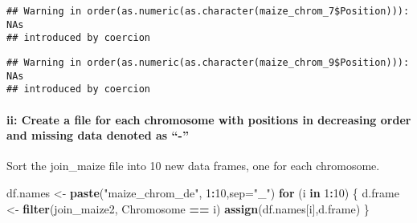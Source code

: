 \documentclass[]{article}
\newenvironment{Shaded}{\begin{snugshade}}{\end{snugshade}}
\newcommand{\ControlFlowTok}[1]{\textcolor[rgb]{0.13,0.29,0.53}{\textbf{#1}}}
\newcommand{\DataTypeTok}[1]{\textcolor[rgb]{0.13,0.29,0.53}{#1}}
\newcommand{\DecValTok}[1]{\textcolor[rgb]{0.00,0.00,0.81}{#1}}
\newcommand{\KeywordTok}[1]{\textcolor[rgb]{0.13,0.29,0.53}{\textbf{#1}}}
\newcommand{\NormalTok}[1]{#1}
\newcommand{\OperatorTok}[1]{\textcolor[rgb]{0.81,0.36,0.00}{\textbf{#1}}}
\newcommand{\StringTok}[1]{\textcolor[rgb]{0.31,0.60,0.02}{#1}}
\let\oldparagraph\paragraph
\renewcommand{\paragraph}[1]{\oldparagraph{#1}\mbox{}}
\begin{document}
\begin{verbatim}
## Warning in order(as.numeric(as.character(maize_chrom_7$Position))): NAs
## introduced by coercion
\end{verbatim}

\begin{Shaded}
\end{Shaded}

\begin{verbatim}
## Warning in order(as.numeric(as.character(maize_chrom_9$Position))): NAs
## introduced by coercion
\end{verbatim}

\begin{Shaded}
\end{Shaded}

\hypertarget{ii-create-a-file-for-each-chromosome-with-positions-in-decreasing-order-and-missing-data-denoted-as--}{%
\paragraph{ii: Create a file for each chromosome with positions in
decreasing order and missing data denoted as
``-''}\label{ii-create-a-file-for-each-chromosome-with-positions-in-decreasing-order-and-missing-data-denoted-as--}}

Sort the join\_maize file into 10 new data frames, one for each
chromosome.

\begin{Shaded}
\begin{Highlighting}[]
\NormalTok{df.names <-}\StringTok{ }\KeywordTok{paste}\NormalTok{(}\StringTok{"maize_chrom_de"}\NormalTok{, }\DecValTok{1}\OperatorTok{:}\DecValTok{10}\NormalTok{,}\DataTypeTok{sep=}\StringTok{"_"}\NormalTok{)}
\ControlFlowTok{for}\NormalTok{ (i }\ControlFlowTok{in} \DecValTok{1}\OperatorTok{:}\DecValTok{10}\NormalTok{) \{}
\NormalTok{  d.frame <-}\StringTok{ }\KeywordTok{filter}\NormalTok{(join_maize2, Chromosome }\OperatorTok{==}\StringTok{ }\NormalTok{i)}
  \KeywordTok{assign}\NormalTok{(df.names[i],d.frame)}
\NormalTok{\}}
\end{Highlighting}
\end{Shaded}
\end{document}
